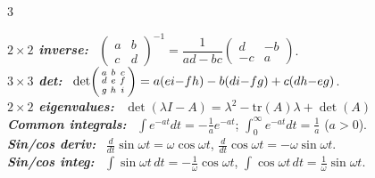 \documentclass[9pt]{extarticle}
\newcommand{\sect}[1]{%
  \vspace{2pt}\par\noindent
  \colorbox{hdrbg}{\makebox[\dimexpr\linewidth-2\fboxsep][l]{%
    \textbf{\footnotesize\textcolor{hdr}{#1}}}}%
  \par\vspace{1.5pt}}
\newcommand{\sub}[1]{\textit{\textbf{#1:}}\ }
\begin{document}
\begin{multicols}{3}
\sect{22. Math Toolbox}
\sub{$2\times2$ inverse} $\begin{pmatrix}a&b\\c&d\end{pmatrix}^{-1}=\dfrac{1}{ad-bc}\begin{pmatrix}d&-b\\-c&a\end{pmatrix}$.\\
\sub{$3\times3$ det} $\det\begin{psmallmatrix}a&b&c\\d&e&f\\g&h&i\end{psmallmatrix}=a(ei{-}fh)-b(di{-}fg)+c(dh{-}eg)$.\\
\sub{$2\times2$ eigenvalues} $\det(\lambda I-A)=\lambda^2-\mathrm{tr}(A)\lambda+\det(A)$\\
\sub{Common integrals} $\int e^{-at}dt=-\tfrac1a e^{-at}$; $\int_0^\infty e^{-at}dt=\tfrac1a$ ($a{>}0$).\\
\sub{Sin/cos deriv} $\tfrac{d}{dt}\sin\omega t=\omega\cos\omega t$, $\tfrac{d}{dt}\cos\omega t=-\omega\sin\omega t$.\\
\sub{Sin/cos integ} $\int\sin\omega t\,dt=-\tfrac1\omega\cos\omega t$, $\int\cos\omega t\,dt=\tfrac1\omega\sin\omega t$.\\


\end{multicols}
\end{document}
